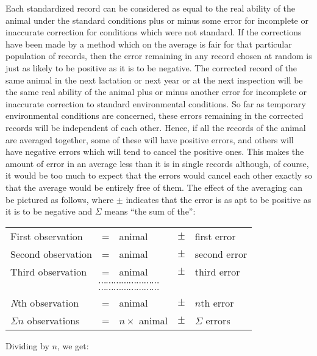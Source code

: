 Each standardized record can be considered as equal to the real
ability of the animal under the standard conditions plus or minus some
error for incomplete or inaccurate correction for conditions which were
not standard. If the corrections have been made by a method which on
the average is fair for that particular population of records, then the
error remaining in any record chosen at random is just as likely to be
positive as it is to be negative. The corrected record of the same animal
in the next lactation or next year or at the next inspection will be the
same real ability of the animal plus or minus another error for incomplete
or inaccurate correction to standard environmental conditions. So
far as temporary environmental conditions are concerned, these errors
remaining in the corrected records will be independent of each other.
Hence, if all the records of the animal are averaged together, some of
these will have positive errors, and others will have negative errors
which will tend to cancel the positive ones. This makes the amount of
error in an average less than it is in single records although, of course,
it would be too much to expect that the errors would cancel each other
exactly so that the average would be entirely free of them. The effect of
the averaging can be pictured as follows, where $\pm$ indicates that the
error is as apt to be positive as it is to be negative and $\Sigma$ means
``the sum of the'':

\begin{table}[h]
	\centering
	\begin{tabular}{lllll}
		First observation			& =	& animal			& $\pm$	& first error \\
		Second observation			& =	& animal			& $\pm$	& second error \\
		Third observation			& =	& animal			& $\pm$	& third error \\
		\multicolumn{5}{c}{$\cdots \cdots \cdots \cdots \cdots \cdots \cdots \cdots$} \\
		\multicolumn{5}{c}{$\cdots \cdots \cdots \cdots \cdots \cdots \cdots \cdots$} \\
		\textit{N}th observation	& =	& animal			& $\pm$	& $n$th error \\
		\hline
		$\Sigma{n}$ observations	& =	& $n \times$ animal	& $\pm$	& $\Sigma$ errors \\
	\end{tabular}
\end{table}

\noindent
Dividing by $n$, we get:

